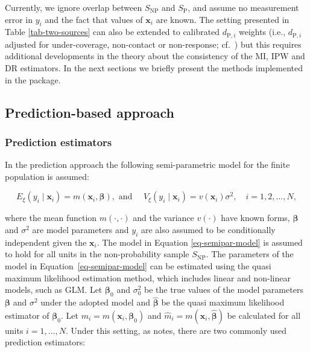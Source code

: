 \documentclass[nojss]{jss}
\begin{document}
Currently, we ignore overlap between \(S_{\text{NP}}\) and
\(S_{\text{P}}\), and assume no measurement error in \(y_i\) and the
fact that values of \(\boldsymbol{x}_i\) are known. The setting
presented in Table \ref{tab-two-sources} can also be extended to
calibrated \(d_{\text{P},i}\) weights (i.e., \(d_{\text{P},i}\) adjusted
for under-coverage, non-contact or non-response;
cf.~\cite{sarndal2005estimation}) but this requires additional
developments in the theory about the consistency of the MI, IPW and DR
estimators. In the next sections we briefly present the methods
implemented in the package.

\subsection{Prediction-based approach}\label{sec-prediction}

\subsubsection{Prediction estimators}\label{prediction-estimators}

In the prediction approach the following semi-parametric model for the
finite population is assumed:

\begin{equation}
E_{\xi}\left(y_i \mid \boldsymbol{x}_i\right)=m\left(\boldsymbol{x}_i, \boldsymbol{\beta}\right), \text { and } \quad V_{\xi}\left(y_i \mid \boldsymbol{x}_i\right)=v\left(\boldsymbol{x}_i\right) \sigma^2, \quad i=1,2, \ldots, N,
\label{eq-semipar-model}
\end{equation}

where the mean function \(m(\cdot,\cdot)\) and the variance \(v(\cdot)\)
have known forms, \(\boldsymbol{\beta}\) and \(\sigma^2\) are model
parameters and \(y_i\) are also assumed to be conditionally independent
given the \(\boldsymbol{x}_i\). The model in Equation
\ref{eq-semipar-model} is assumed to hold for all units in the
non-probability sample \(S_{\text{NP}}\). The parameters of the model in
Equation~\ref{eq-semipar-model} can be estimated using the quasi maximum
likelihood estimation method, which includes linear and non-linear
models, such as GLM. Let \(\boldsymbol{\beta}_0\) and \(\sigma^2_0\) be
the true values of the model parameters \(\boldsymbol{\beta}\) and
\(\sigma^2\) under the adopted model and \(\hat{\boldsymbol{\beta}}\) be
the quasi maximum likelihood estimator of \(\boldsymbol{\beta}_0\). Let
\(m_i=m(\boldsymbol{x}_i, \boldsymbol{\beta}_0)\) and
\(\hat{m}_i=m(\boldsymbol{x}_i, \hat{\boldsymbol{\beta}})\) be
calculated for all units \(i=1,...,N\). Under this setting, as
\citet{wu2022statistical} notes, there are two commonly used prediction
estimators:
\end{document}
